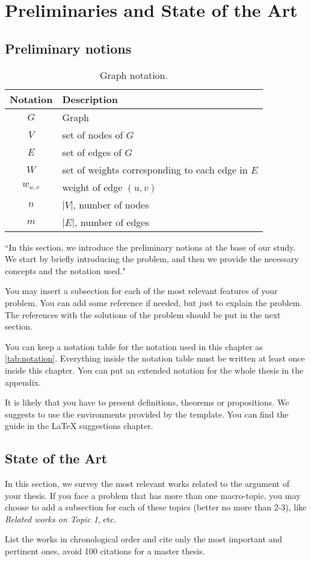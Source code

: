 \chapter{Preliminaries and State of the Art}
\label{ch:preliminaries_and_sota}

\section{Preliminary notions}
\label{sec:preliminaries}

\begin{table}[!ht]
\centering
\begin{tabular}{c l} \hline
\textbf{Notation}&\textbf{Description} \\ \hline
$G$&Graph\\
$V$&set of nodes of $G$\\
$E$&set of edges of $G$\\
$W$&set of weights corresponding to each edge in $E$\\
$w_{u,v}$&weight of edge $(u,v)$\\
$n$&$|V|$, number of nodes\\
$m$&$|E|$, number of edges\\
\hline
\end{tabular}
\caption{Graph notation.}
\label{tab:notation}
\end{table}

``In this section, we introduce the preliminary notions at the base of our study. We start by briefly introducing the problem, and then we provide the necessary concepts and the notation used."

You may insert a subsection for each of the most relevant features of your problem. You can add some reference if needed, but just to explain the problem. The references with the solutions of the problem should be put in the next section.

You can keep a notation table for the notation used in this chapter as \autoref{tab:notation}. Everything inside the notation table must be written at least once inside this chapter. You can put an extended notation for the whole thesis in the appendix.

It is likely that you have to present definitions, theorems or propositions. We suggests to use the environments provided by the template. You can find the guide in the LaTeX suggestions chapter.

\section{State of the Art}
\label{sec:sota}

In this section, we survey the most relevant works related to the argument of your thesis. If you face a problem that has more than one macro-topic, you may choose to add a subsection for each of these topics (better no more than 2-3), like \emph{Related works on Topic 1}, etc.

List the works in chronological order and cite only the most important and pertinent ones, avoid 100 citations for a master thesis.